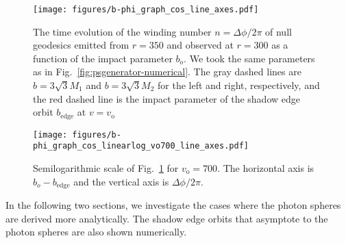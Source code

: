 \documentclass[prd,showpacs,preprintnumbers,groupedaddress,superscriptaddress,nofootinbib,11pt]{revtex4-1} %
\theoremstyle{newplain}
\begin{document}
\begin{figure}[h]%
\texttt{[image: figures/b-phi\_graph\_cos\_line\_axes.pdf]}
\caption{\label{fig:deflection_angle-numerical} 
The time evolution of the winding number $n=\Delta \phi/2\pi$ of null geodesics emitted from $r=350$ and observed at $r=300$ as a function of the impact parameter $b_o$. We took the same parameters as in Fig.~\ref{fig:psgenerator-numerical}. The gray dashed lines are $b=3\sqrt{3}M_1$ and $b=3\sqrt{3}M_2$ for the left and right, respectively, and the red dashed line is the impact parameter of the shadow edge orbit $b_{\text{edge}}$ at $v=v_\text{o}$
}
\end{figure}

\begin{figure}[h]%
\texttt{[image: figures/b-phi\_graph\_cos\_linearlog\_vo700\_line\_axes.pdf]}
\caption{\label{fig:deflection_angle-log_plot}
Semilogarithmic scale of Fig.~\ref{fig:deflection_angle-numerical} for $v_\text{o}=700$. 
The horizontal axis is $b_o-b_{\text{edge}}$
and the vertical axis is $\Delta \phi/2\pi$.
}
\end{figure}

In the following two sections, we investigate the cases where the photon spheres are derived more analytically.
The shadow edge orbits that asymptote to the photon spheres are also shown numerically.



\afterpage{\clearpage}
\newpage

\end{document}
